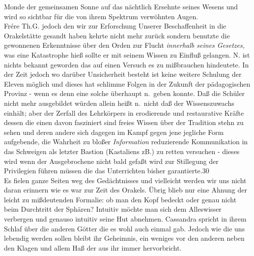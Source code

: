 \documentclass[
]{article}
\begin{document}
Monde der gemeinsamen Sonne auf das nächtlich Ersehnte seines Wesens und
wird so sichtbar für die von ihrem Spektrum verwöhnten Augen.\\
Frére Th.G. jedoch den wir zur Erforschung Unserer Beschaffenheit in die
Orakelstätte gesandt haben kehrte nicht mehr zurück sondern benutzte die
gewonnenen Erkenntnisse über den Orden zur Flucht \emph{innerhalb seines
Gesetzes,} was eine Katastrophe hieß sollte er mit seinem Wissen zu
Einfluß gelangen. N. ist nichts bekannt geworden das auf einen Versuch
es zu mißbrauchen hindeutete. In der Zeit jedoch wo darüber Unsicherheit
besteht ist keine weitere Schulung der Eleven möglich und dieses hat
schlimme Folgen in der Zukunft der pädagogischen Provinz - wenn es denn
eine solche überhaupt n.~geben konnte. Daß die Schüler nicht mehr
ausgebildet würden allein heißt n.~nicht daß der Wissenszuwachs einhält;
aber der Zerfall des Lehrkörpers in erodierende und restaurative Kräfte
dessen die einen davon fasziniert sind freies Wissen über der Tradition
stehn zu sehen und deren andere sich dagegen im Kampf gegen jene
jegliche Form aufgebende, die Wahrheit zu bloßer \emph{Information}
reduzierende Kommunikation in das Schweigen als letzter Bastion
(Kastaliens zB.) zu retten versuchen - dieses wird wenn der
Ausgebrochene nicht bald gefaßt wird zur Stillegung der Privilegien
führen müssen die das Unterrichten bisher garantierte.30\\
Es fielen ganze Seiten weg des Gedächtnisses und vielleicht werden wir
uns nicht daran erinnern wie es war zur Zeit des Orakels. Übrig blieb
nur eine Ahnung der leicht zu mißdeutenden Formalie: ob man den Kopf
bedeckt oder genau nicht beim Durchtritt der Sphären? Intuitiv möchte
man sich dem Alleswisser verbergen und genauso intuitiv seine Hut
abnehmen. Cassandra spricht in ihrem Schlaf über die anderen Götter die
es wohl auch einmal gab. Jedoch wie die uns lebendig werden sollen
bleibt ihr Geheimnis, ein weniges vor den anderen neben den Klagen und
allem Haß der aus ihr immer hervorbricht.
\end{document}
